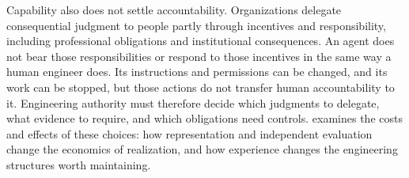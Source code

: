 
Capability also does not settle accountability. Organizations delegate consequential judgment to people partly through incentives and responsibility, including professional obligations and institutional consequences\citep{marchsimon1958}. An agent does not bear those responsibilities or respond to those incentives in the same way a human engineer does. Its instructions and permissions can be changed, and its work can be stopped, but those actions do not transfer human accountability to it. Engineering authority must therefore decide which judgments to delegate, what evidence to require, and which obligations need controls.  examines the costs and effects of these choices: how representation and independent evaluation change the economics of realization, and how experience changes the engineering structures worth maintaining.
